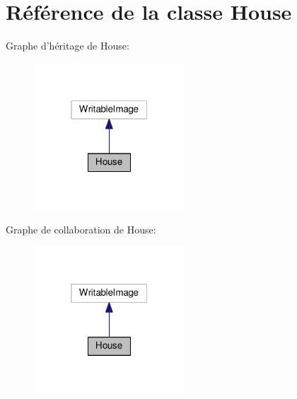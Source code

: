 \hypertarget{class_house}{\section{Référence de la classe House}
\label{class_house}
}


Graphe d'héritage de House\-:
\nopagebreak
\begin{figure}[H]
\begin{center}
\leavevmode
\includegraphics[width=160pt]{class_house__inherit__graph}
\end{center}
\end{figure}


Graphe de collaboration de House\-:
\nopagebreak
\begin{figure}[H]
\begin{center}
\leavevmode
\includegraphics[width=160pt]{class_house__coll__graph}
\end{center}
\end{figure}
